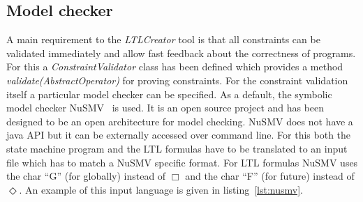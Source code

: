 \subsection{Model checker}

A main requirement to the \emph{LTLCreator} tool is that all constraints can be validated immediately and allow fast feedback about the correctness of programs. For this a \emph{ConstraintValidator} class has been defined which provides a method \emph{validate(AbstractOperator)} for proving constraints.
For the constraint validation itself a particular model checker can be specified. As a default, the symbolic model checker NuSMV~\cite{springerlink:10.1007/s100090050046,NuSMV2} is used. It is an open source project and has been designed to be an open architecture for model checking. NuSMV does not have a java API but it can be externally accessed over command line. For this both the state machine program and the LTL formulas have to be translated to an input file which has to match a NuSMV specific format. For LTL formulas NuSMV uses the char ``G'' (for globally) instead of $\Box$ and the char ``F'' (for future) instead of $\Diamond$. An example of this input language is given in listing~\ref{lst:nusmv}.

